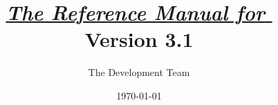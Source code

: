 \documentclass[openany]{jsbook}
\title{\underline{{\HUGE $\;\:$\textit{The Reference Manual for} \EL$\;\:$}}\\Version 3.1}
\author{The \EL \;Development Team}
\date{\today}
\begin{document}
\begin{fullwidthpage}
\maketitle
\end{fullwidthpage}
\frontmatter
\setcounter{page}{0}
\thispagestyle{empty}
$\;$\\
\newpage
\begin{fullwidthpage}
\tableofcontents
\listoffigures
\end{fullwidthpage}
\mainmatter
\end{document}
